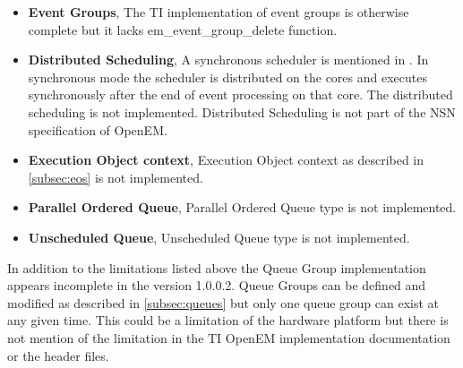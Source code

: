 \begin{itemize}
    \item \textbf{Event Groups},
        The TI implementation of event groups is otherwise complete but it lacks
        em\_event\_group\_delete function.
    \item \textbf{Distributed Scheduling},
        A synchronous scheduler is mentioned in \cite{openemwhite}. In
        synchronous mode the scheduler is distributed on the cores and executes
        synchronously after the end of event processing on that core. The
        distributed scheduling is not implemented. Distributed Scheduling is not
        part of the NSN specification of OpenEM.
    \item \textbf{Execution Object context},
        Execution Object context as described in \ref{subsec:eos} is not
        implemented.
    \item \textbf{Parallel Ordered Queue},
        Parallel Ordered Queue type is not implemented.
    \item \textbf{Unscheduled Queue},
        Unscheduled Queue type is not implemented.
\end{itemize}

In addition to the limitations listed above the Queue Group implementation
appears incomplete in the version 1.0.0.2. Queue Groups can be defined and
modified as described in \ref{subsec:queues} but only one queue group can exist
at any given time. This could be a limitation of the hardware platform but there
is not mention of the limitation in the TI OpenEM implementation documentation
or the header files.

